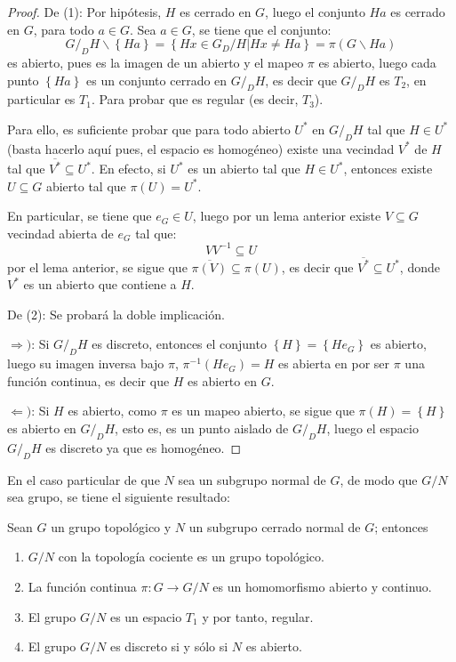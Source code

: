 \documentclass[12pt]{report}
\theoremstyle{largebreak}
\newcommand{\cf}[3]{\ensuremath{#1:#2\rightarrow#3}}
\newcommand{\Cls}[1]{\ensuremath{\overline{#1}}}
\begin{document}
    \begin{proof}
        De (1): Por hipótesis, $H$ es cerrado en $G$, luego el conjunto $Ha$ es cerrado en $G$, para todo $a\in G$. Sea $a\in G$, se tiene que el conjunto:
        \begin{equation*}
            G/_DH\backslash\left\{Ha \right\}=\left\{Hx\in G_D/H\Big|Hx\neq Ha \right\}=\pi(G\backslash Ha)
        \end{equation*}
        es abierto, pues es la imagen de un abierto y el mapeo $\pi$ es abierto, luego cada punto $\left\{Ha \right\}$ es un conjunto cerrado en $G/_DH$, es decir que $G/_DH$ es $T_2$, en particular es $T_1$. Para probar que es regular (es decir, $T_3$).

        Para ello, es suficiente probar que para todo abierto $U^*$ en $G/_DH$ tal que $H\in U^*$ (basta hacerlo aquí pues, el espacio es homogéneo) existe una vecindad $V^*$ de $H$ tal que $\Cls{V^*}\subseteq U^*$. En efecto, si $U^*$ es un abierto tal que $H\in U^*$, entonces existe $U\subseteq G$ abierto tal que $\pi(U)=U^*$.

        En particular, se tiene que $e_G\in U$, luego por un lema anterior existe $V\subseteq G$ vecindad abierta de $e_G$ tal que:
        \begin{equation*}
            VV^{-1}\subseteq U
        \end{equation*}
        por el lema anterior, se sigue que $\Cls{\pi(V)}\subseteq \pi(U)$, es decir que $\Cls{V^*}\subseteq U^*$, donde $V^*$ es un abierto que contiene a $H$.

        De (2): Se probará la doble implicación.

        $\Rightarrow)$: Si $G/_DH$ es discreto, entonces el conjunto $\left\{H\right\}=\left\{He_G\right\}$ es abierto, luego su imagen inversa bajo $\pi$, $\pi^{-1}(He_G)=H$ es abierta en por ser $\pi$ una función continua, es decir que $H$ es abierto en $G$.

        $\Leftarrow)$: Si $H$ es abierto, como $\pi$ es un mapeo abierto, se sigue que $\pi(H)=\left\{H\right\}$ es abierto en $G/_DH$, esto es, es un punto aislado de $G/_DH$, luego el espacio $G/_DH$ es discreto ya que es homogéneo.
    \end{proof}

    En el caso particular de que $N$ sea un subgrupo normal de $G$, de modo que $G/N$ sea grupo, se tiene el siguiente resultado:
    
    \begin{theor}
        Sean $G$ un grupo topológico y $N$ un subgrupo cerrado normal de $G$; entonces
        \begin{enumerate}
            \item $G/N$ con la topología cociente es un grupo topológico.
            \item La función continua $\cf{\pi}{G}{G/N}$ es un homomorfismo abierto y continuo.
            \item El grupo $G/N$ es un espacio $T_1$ y por tanto, regular.
            \item El grupo $G/N$ es discreto si y sólo si $N$ es abierto.
        \end{enumerate}
    \end{theor}
\end{document}
